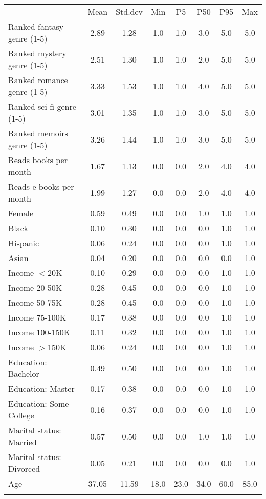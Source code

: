 \begin{center}
\begin{tabular}{lccccccc}
\hline \noalign{\smallskip} & Mean & Std.dev & Min & P5 & P50 & P95 & Max\\
\noalign{\smallskip}\hline \noalign{\smallskip}Ranked fantasy genre (1-5) & 2.89 & 1.28 & 1.0 & 1.0 & 3.0 & 5.0 & 5.0\\
Ranked mystery genre (1-5) & 2.51 & 1.30 & 1.0 & 1.0 & 2.0 & 5.0 & 5.0\\
Ranked romance genre (1-5) & 3.33 & 1.53 & 1.0 & 1.0 & 4.0 & 5.0 & 5.0\\
Ranked sci-fi genre (1-5) & 3.01 & 1.35 & 1.0 & 1.0 & 3.0 & 5.0 & 5.0\\
Ranked memoirs genre (1-5) & 3.26 & 1.44 & 1.0 & 1.0 & 3.0 & 5.0 & 5.0\\
Reads books per month & 1.67 & 1.13 & 0.0 & 0.0 & 2.0 & 4.0 & 4.0\\
Reads e-books per month & 1.99 & 1.27 & 0.0 & 0.0 & 2.0 & 4.0 & 4.0\\
Female & 0.59 & 0.49 & 0.0 & 0.0 & 1.0 & 1.0 & 1.0\\
Black & 0.10 & 0.30 & 0.0 & 0.0 & 0.0 & 1.0 & 1.0\\
Hispanic & 0.06 & 0.24 & 0.0 & 0.0 & 0.0 & 1.0 & 1.0\\
Asian & 0.04 & 0.20 & 0.0 & 0.0 & 0.0 & 0.0 & 1.0\\
Income $<$20K & 0.10 & 0.29 & 0.0 & 0.0 & 0.0 & 1.0 & 1.0\\
Income 20-50K & 0.28 & 0.45 & 0.0 & 0.0 & 0.0 & 1.0 & 1.0\\
Income 50-75K & 0.28 & 0.45 & 0.0 & 0.0 & 0.0 & 1.0 & 1.0\\
Income 75-100K & 0.17 & 0.38 & 0.0 & 0.0 & 0.0 & 1.0 & 1.0\\
Income 100-150K & 0.11 & 0.32 & 0.0 & 0.0 & 0.0 & 1.0 & 1.0\\
Income $>$150K & 0.06 & 0.24 & 0.0 & 0.0 & 0.0 & 1.0 & 1.0\\
Education: Bachelor & 0.49 & 0.50 & 0.0 & 0.0 & 0.0 & 1.0 & 1.0\\
Education: Master & 0.17 & 0.38 & 0.0 & 0.0 & 0.0 & 1.0 & 1.0\\
Education: Some College & 0.16 & 0.37 & 0.0 & 0.0 & 0.0 & 1.0 & 1.0\\
Marital status: Married & 0.57 & 0.50 & 0.0 & 0.0 & 1.0 & 1.0 & 1.0\\
Marital status: Divorced & 0.05 & 0.21 & 0.0 & 0.0 & 0.0 & 0.0 & 1.0\\
Age & 37.05 & 11.59 & 18.0 & 23.0 & 34.0 & 60.0 & 85.0\\
\noalign{\smallskip}\hline\end{tabular}\\
\end{center}
